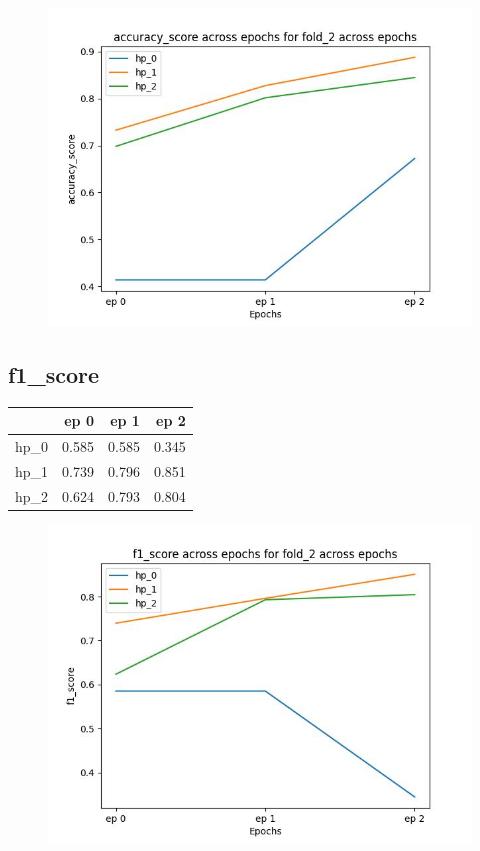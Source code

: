 \documentclass{article}
\begin{document}
\begin{figure}[H]
\includegraphics[scale = 0.75]{fold_2/accuracy_score}
\end{figure}
\subsection{f1\_score}
\begin{tabular}{lrrr}
\toprule
{} &   ep 0 &   ep 1 &   ep 2 \\
\midrule
hp\_0 &  0.585 &  0.585 &  0.345 \\
hp\_1 &  0.739 &  0.796 &  0.851 \\
hp\_2 &  0.624 &  0.793 &  0.804 \\
\bottomrule
\end{tabular}

\begin{figure}[H]
\includegraphics[scale = 0.75]{fold_2/f1_score}
\end{figure}
\end{document}
